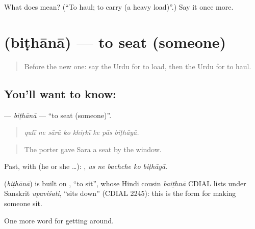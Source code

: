 \begin{tcolorbox}[breakable,colback=teal!4,colframe=teal!35!black,title={Before you move on}]
What does  mean? (\textquotedblleft{}To haul; to carry (a heavy load)\textquotedblright{}.) Say it once more.
\end{tcolorbox}
\section[\texorpdfstring{\ur{بٹھانا} (biṭhānā)}{بٹھانا (biṭhānā)}]{ (biṭhānā) — to seat (someone)}

\label{lesson:UR-C387-bithana}



\begin{quote}
Before the new one: say the Urdu for to load, then the Urdu for to haul.
\end{quote}

\subsection*{You'll want to know: }
\textbf{} — \emph{biṭhānā} — \textquotedblleft{}to seat (someone)\textquotedblright{}.

\begin{quote}
       
\end{quote}

\begin{quote}
\emph{qulī ne sārā ko khiṛkī ke pās biṭhāyā.}
\end{quote}

\begin{quote}
The porter gave Sara a seat by the window.
\end{quote}

Past, with  (he or she …):     , \emph{us ne bachche ko biṭhāyā}.

\begin{cousinweb}
\textbf{} (\emph{biṭhānā}) is built on \textbf{}, \textquotedblleft{}to sit\textquotedblright{}, whose Hindi cousin \emph{baiṭhnā} CDIAL lists under Sanskrit \emph{upaviśati}, \textquotedblleft{}sits down\textquotedblright{} (CDIAL 2245): this is the form for making someone sit.
\end{cousinweb}

\begin{grammarlens}[title={What you've built}]
One more word for getting around.
\end{grammarlens}

